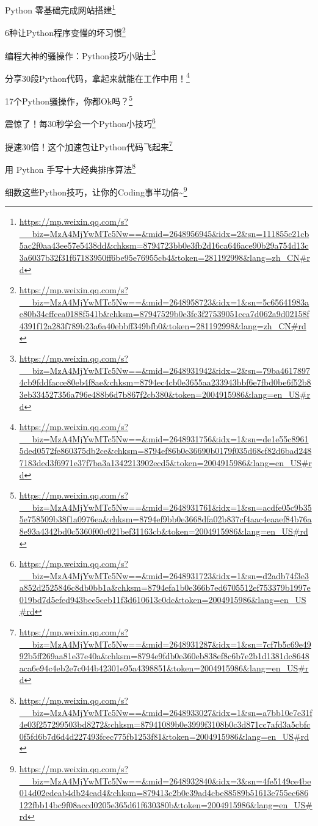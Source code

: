 \documentclass[]{ctexbook}
\renewcommand{\href}[2]{#2\footnote{\url{#1}}}
\begin{document}
\href{https://mp.weixin.qq.com/s?__biz=MzA4MjYwMTc5Nw==\&mid=2648956945\&idx=2\&sn=111855c21cb5ac2f0aa43ee57e5438dd\&chksm=8794723bb0e3fb2d16ca646ace90b29a754d13c3a6037b32f31f67183950ff6be95e76955cb4\&token=281192998\&lang=zh_CN\#rd}{Python 零基础完成网站搭建}

\href{https://mp.weixin.qq.com/s?__biz=MzA4MjYwMTc5Nw==\&mid=2648958723\&idx=1\&sn=5c65641983ae80b34cffcea0188f541b\&chksm=87947529b0e3fc3f27539051cca7d062a9d02158f4391f12a283f789b23a6a40ebbff349bfb0\&token=281192998\&lang=zh_CN\#rd}{6种让Python程序变慢的坏习惯}

\href{https://mp.weixin.qq.com/s?__biz=MzA4MjYwMTc5Nw==\&mid=2648931942\&idx=2\&sn=79ba46178974cb9fddfacce80eb4f8ae\&chksm=8794ec4cb0e3655aa233943bbf6e7fbd0be6f52b83eb334527356a796e488b6d7b867f2cb380\&token=2004915986\&lang=en_US\#rd}{编程大神的骚操作：Python技巧小贴士}

\href{https://mp.weixin.qq.com/s?__biz=MzA4MjYwMTc5Nw==\&mid=2648931756\&idx=1\&sn=de1e55c89615ded0572fe860375db2ce\&chksm=8794ef86b0e36690b0179f035d68cf82d6bad2487183ded3f6971e37f7ba3a1342213902ecd5\&token=2004915986\&lang=en_US\#rd}{分享30段Python代码，拿起来就能在工作中用！}

\href{https://mp.weixin.qq.com/s?__biz=MzA4MjYwMTc5Nw==\&mid=2648931761\&idx=1\&sn=acdfe05c9b355e758509b38f1a0976ea\&chksm=8794ef9bb0e3668dfa02b837cf4aac4eaaef84b76a8e93a4342bd0c5360f00c021bef31163cb\&token=2004915986\&lang=en_US\#rd}{17个Python骚操作，你都Ok吗？}

\href{https://mp.weixin.qq.com/s?__biz=MzA4MjYwMTc5Nw==\&mid=2648931723\&idx=1\&sn=d2adb74f3e3a852d2525846c8db0bb1a\&chksm=8794efa1b0e366b7ed6705512ef753379b1997e019bd7d5efed943bee5ceb11f3d610613c0dc\&token=2004915986\&lang=en_US\#rd}{震惊了！每30秒学会一个Python小技巧}

\href{https://mp.weixin.qq.com/s?__biz=MzA4MjYwMTc5Nw==\&mid=2648931287\&idx=1\&sn=7cf7b5c69e4992b5ff269aa81e37e40a\&chksm=8794e9fdb0e360eb838ef8c6b7e2b1d1381dc8648aca6e94c4eb2e7c044b42301e95a4398851\&token=2004915986\&lang=en_US\#rd}{提速30倍！这个加速包让Python代码飞起来}

\href{https://mp.weixin.qq.com/s?__biz=MzA4MjYwMTc5Nw==\&mid=2648933027\&idx=1\&sn=a7bb10e7e31f4e03f257299503bd8272\&chksm=87941089b0e3999f3108b0c3d871cc7afd3a5cbfc0f5fd6b7d6d4d227493fcec775fb1253f81\&token=2004915986\&lang=en_US\#rd}{用 Python 手写十大经典排序算法}

\href{https://mp.weixin.qq.com/s?__biz=MzA4MjYwMTc5Nw==\&mid=2648932840\&idx=3\&sn=4fe5149ce4be014d02edeab4db24cad4\&chksm=879413c2b0e39ad4cbe88589b51613e755ec686122fbb14bc9f08accd0205e365d61f630380b\&token=2004915986\&lang=en_US\#rd}{细数这些Python技巧，让你的Coding事半功倍\textasciitilde{}}
\end{document}
